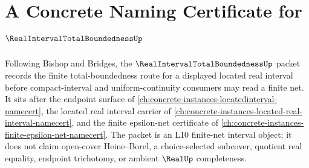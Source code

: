 \chapter{A Concrete Naming Certificate for $\RealIntervalTotalBoundednessUp$}
\label{ch:concrete-instances-real-interval-total-boundedness-namecert}

Following Bishop and Bridges, the $\RealIntervalTotalBoundednessUp$ packet records the finite total-boundedness route for a displayed located real interval before compact-interval and uniform-continuity consumers may read a finite net. It sits after the endpoint surface of \autoref{ch:concrete-instances-locatedinterval-namecert}, the located real interval carrier of \autoref{ch:concrete-instances-located-real-interval-namecert}, and the finite epsilon-net certificate of \autoref{ch:concrete-instances-finite-epsilon-net-namecert}. The packet is an L10 finite-net interval object; it does not claim open-cover Heine--Borel, a choice-selected subcover, quotient real equality, endpoint trichotomy, or ambient $\RealUp$ completeness.

